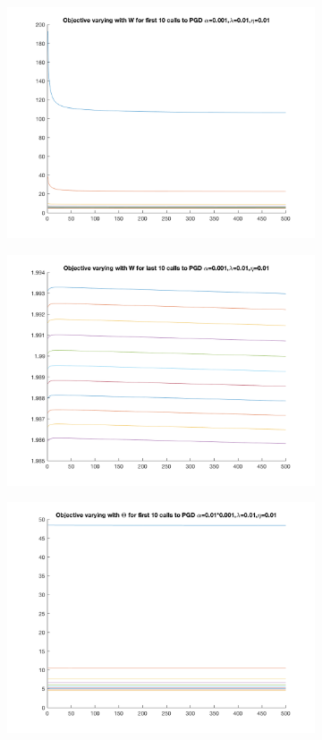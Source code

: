 \documentclass{article}
\newcommand{\0}{\mathrm{0}}
\newcommand{\1}{\mathrm{1}}
\begin{document}
\begin{figure}[H]
\begin{subfigure}[b]{0.3\textwidth}
    \includegraphics[width=\textwidth]{fixed-step-change-alpha-W100.png}
  \end{subfigure}
\centering
  \begin{subfigure}[b]{0.3\textwidth}
    \includegraphics[width=\textwidth]{fixed-step-change-alpha-W100last.png}
  \end{subfigure}
\centering
  \begin{subfigure}[b]{0.3\textwidth}
    \includegraphics[width=\textwidth]{fixed-step-change-alpha-Th100.png}

\end{subfigure}
\end{figure}
\end{document}
